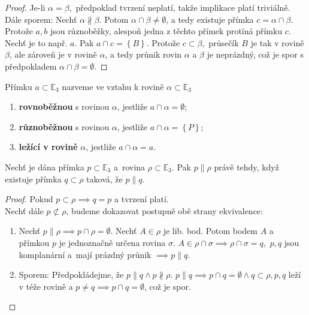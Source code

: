 \begin{proof}
    Je-li $\alpha = \beta,$ předpoklad tvrzení neplatí, takže implikace platí
    triviálně. \\
    Dále sporem: Nechť $\alpha \nparallel \beta.$ Potom  $ \alpha \cap \beta \ne
    \emptyset$, a tedy existuje přímka $c = \alpha \cap \beta.$ Protože $a,b$ jsou různoběžky,
    alespoň jedna z těchto přímek protíná přímku $c.$ Nechť je to např. $a.$ Pak
    $a \cap c = \left \{ B \right \} .$ Protože $c \subset \beta,$ průsečík
    $B$ je tak v rovině $\beta$, ale zároveň je v rovině $\alpha$, a tedy
   průnik rovin $\alpha$ a $\beta$ je neprázdný, což je spor s předpokladem
    $\alpha \cap \beta = \emptyset.$
\end{proof}

\begin{definition}
    Přímku $a \subset \mathbb E_3$ nazveme ve vztahu k rovině $\alpha \subset \mathbb E_3$
    \begin{enumerate}[$i.$]
        \item \textbf{rovnoběžnou} s rovinou $\alpha$, jestliže $a\cap \alpha = \emptyset$;
        \item \textbf{různoběžnou} s rovinou $\alpha$, jestliže $a\cap \alpha = \left \{ P \right \} $;
        \item \textbf{ležící v rovině} $\alpha$, jestliže $a \cap \alpha = a$.
    \end{enumerate}
\end{definition}

\begin{veta}
    Nechť je dána přímka $p \subset \mathbb E_3$ a~rovina $\rho \subset \mathbb E_3$. Pak $p \parallel \rho$ právě tehdy, když existuje přímka $q \subset \rho$ taková, že $p \parallel q$.
\end{veta}

\begin{proof}
    Pokud $p \subset \rho \implies q=p$ a tvrzení platí.\\
    Nechť dále $p\not \subset \rho$, budeme dokazovat postupně obě strany ekvivalence:
    \begin{enumerate}
        \item[$\implies$] Nechť $p\parallel\rho\implies p \cap \rho=\emptyset.$
        Nechť $A\in\rho$ je lib. bod. Potom bodem $A$ a přímkou $p$ je jednoznačně
        určena rovina $\sigma.$ $A\in \rho\cap\sigma \implies \rho\cap\sigma=q,$
        $p,q$ jsou komplanární a~mají prázdný průnik $\implies p\parallel q.$
        \item[$\impliedby$] Sporem: Předpokládejme, že $p\parallel q \land
        p\nparallel \rho.$ $p\parallel q \implies p\cap q=\emptyset\land q \subset \rho,
        p,q$ leží v téže rovině a $p\ne q\implies p\cap q = \emptyset$, což je spor.\qedhere
    \end{enumerate}
\end{proof}


